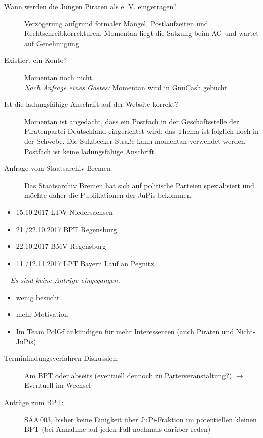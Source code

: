 \begin{Protokoll}
  	
  	\begin{description}
  		\item[Wann werden die Jungen Piraten als e. V. eingetragen?]
  			Verzögerung aufgrund formaler Mängel, Postlaufzeiten und Rechtschreibkorrekturen. Momentan liegt die Satzung beim AG und wartet auf Genehmigung.
  		\item[Existiert ein Konto?]
  			Momentan noch nicht.\\ \emph{Nach Anfrage eines Gastes:} Momentan wird in GnuCash gebucht
  		\item[Ist die ladungsfähige Anschrift auf der Website korrekt?]
  			Momentan ist angedacht, dass ein Postfach in der Geschäftsstelle der Piratenpartei Deutschland eingerichtet wird; das Thema ist folglich noch in der Schwebe.
  			Die Sulzbecker Straße kann momentan verwendet werden. Postfach ist keine ladungsfähige Anschrift.
  		\item[Anfrage vom Staatsarchiv Bremen]
  			Das Staatsarchiv Bremen hat sich auf politische Parteien spezialisiert und möchte daher die Publikationen der JuPis bekommen.
  	\end{description}
    
	    \begin{itemize}
	    	\item 15.10.2017 LTW Niedersachsen
	    	\item 21./22.10.2017 BPT Regensburg
	    	\item 22.10.2017 BMV Regensburg
	    	\item 11./12.11.2017 LPT Bayern Lauf an Pegnitz
	    \end{itemize}
    
    	\emph{-- Es sind keine Anträge eingegangen. --}
    
    	\begin{itemize}
    		\item wenig besucht
    		\item mehr Motivation
    		\item Im Team PolGf ankündigen für mehr Interessenten (auch Piraten und Nicht-JuPis)
    	\end{itemize}
    
    	\begin{description}
    		\item[Terminfindungsverfahren-Diskussion:]
    			Am BPT oder abseits (eventuell dennoch zu Parteiveranstaltung?) $\rightarrow$ Eventuell im Wechsel
    		\item[Anträge zum BPT:]
    		SÄA\,003, bisher keine Einigkeit über JuPi-Fraktion im potentiellen kleinen BPT (bei Annahme auf jeden Fall nochmals darüber reden)
    	\end{description}
    

\end{Protokoll}
